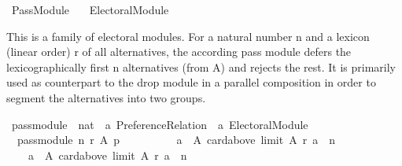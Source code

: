 %
\begin{isabellebody}%
%
%
\isadelimdocument
\isanewline
%
\endisadelimdocument
%
\isatagdocument
\isanewline
\isanewline
%
\isamarkuptrue%
%
\endisatagdocument
{\isafolddocument}%
%
\isadelimdocument
%
\endisadelimdocument
%
\isadelimtheory
%
\endisadelimtheory
%
\isatagtheory
{}\isamarkupfalse%
\ Pass{\isacharunderscore}{\kern0pt}Module\isanewline
\ \ \ {\isachardoublequoteopen}{\isachardot}{\kern0pt}{\isachardot}{\kern0pt}{\isacharslash}{\kern0pt}Electoral{\isacharunderscore}{\kern0pt}Module{\isachardoublequoteclose}\isanewline
{}%
\endisatagtheory
{\isafoldtheory}%
%
\isadelimtheory
%
\endisadelimtheory
%
\begin{isamarkuptext}%
This is a family of electoral modules. For a natural number n and a
lexicon (linear order) r of all alternatives, the according pass module
defers the lexicographically first n alternatives (from A) and rejects
the rest. It is primarily used as counterpart to the drop module in a
parallel composition in order to segment the alternatives into two groups.%
\end{isamarkuptext}\isamarkuptrue%
%
\isadelimdocument
%
\endisadelimdocument
%
\isatagdocument
%
\isamarkuptrue%
%
\endisatagdocument
{\isafolddocument}%
%
\isadelimdocument
%
\endisadelimdocument
{}\isamarkupfalse%
\ pass{\isacharunderscore}{\kern0pt}module\ {\isacharcolon}{\kern0pt}{\isacharcolon}{\kern0pt}\ {\isachardoublequoteopen}nat\ {\isasymRightarrow}\ {\isacharprime}{\kern0pt}a\ Preference{\isacharunderscore}{\kern0pt}Relation\ {\isasymRightarrow}\ {\isacharprime}{\kern0pt}a\ Electoral{\isacharunderscore}{\kern0pt}Module{\isachardoublequoteclose}\ \isanewline
\ \ {\isachardoublequoteopen}pass{\isacharunderscore}{\kern0pt}module\ n\ r\ A\ p\ {\isacharequal}{\kern0pt}\isanewline
\ \ \ \ {\isacharparenleft}{\kern0pt}{\isacharbraceleft}{\kern0pt}{\isacharbraceright}{\kern0pt}{\isacharcomma}{\kern0pt}\isanewline
\ \ \ \ {\isacharbraceleft}{\kern0pt}a\ {\isasymin}\ A{\isachardot}{\kern0pt}\ card{\isacharparenleft}{\kern0pt}above\ {\isacharparenleft}{\kern0pt}limit\ A\ r{\isacharparenright}{\kern0pt}\ a{\isacharparenright}{\kern0pt}\ {\isachargreater}{\kern0pt}\ n{\isacharbraceright}{\kern0pt}{\isacharcomma}{\kern0pt}\isanewline
\ \ \ \ {\isacharbraceleft}{\kern0pt}a\ {\isasymin}\ A{\isachardot}{\kern0pt}\ card{\isacharparenleft}{\kern0pt}above\ {\isacharparenleft}{\kern0pt}limit\ A\ r{\isacharparenright}{\kern0pt}\ a{\isacharparenright}{\kern0pt}\ {\isasymle}\ n{\isacharbraceright}{\kern0pt}{\isacharparenright}{\kern0pt}{\isachardoublequoteclose}%

\end{isabellebody}
